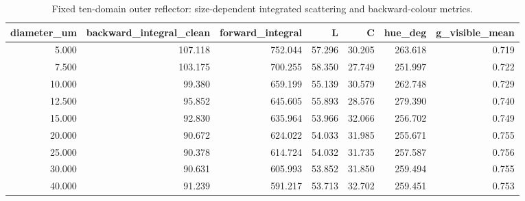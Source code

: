 \begin{table}
\caption{Fixed ten-domain outer reflector: size-dependent integrated scattering and backward-colour metrics.}
\label{tab:size_dependence_evidence}
\begin{tabular}{rrrrrrr}
\toprule
diameter_um & backward_integral_clean & forward_integral & L & C & hue_deg & g_visible_mean \\
\midrule
5.000 & 107.118 & 752.044 & 57.296 & 30.205 & 263.618 & 0.719 \\
7.500 & 103.175 & 700.255 & 58.350 & 27.749 & 251.997 & 0.722 \\
10.000 & 99.380 & 659.199 & 55.139 & 30.579 & 262.748 & 0.729 \\
12.500 & 95.852 & 645.605 & 55.893 & 28.576 & 279.390 & 0.740 \\
15.000 & 92.830 & 635.964 & 53.966 & 32.066 & 256.702 & 0.749 \\
20.000 & 90.672 & 624.022 & 54.033 & 31.985 & 255.671 & 0.755 \\
25.000 & 90.378 & 614.724 & 54.032 & 31.735 & 257.587 & 0.756 \\
30.000 & 90.631 & 605.993 & 53.852 & 31.850 & 259.494 & 0.755 \\
40.000 & 91.239 & 591.217 & 53.713 & 32.702 & 259.451 & 0.753 \\
\bottomrule
\end{tabular}
\end{table}
